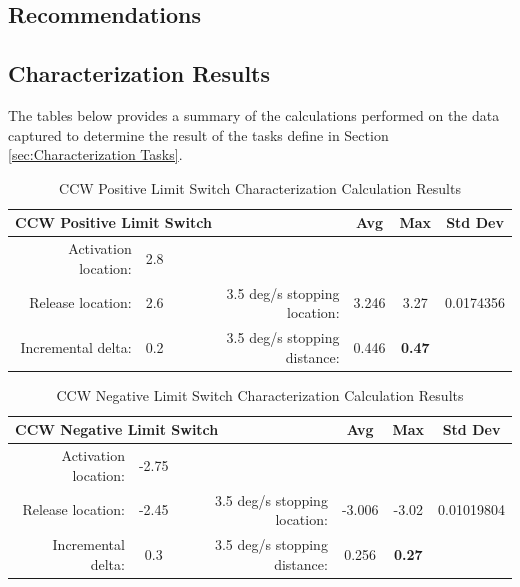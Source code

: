 \documentclass[SE,lsstdraft,authoryear,toc]{lsstdoc}
\begin{document}
\begin{landscape}
\section{Recommendations}

\subsection{Characterization Results}

The tables below provides a summary of the calculations performed on the
data captured to determine the result of the tasks define in Section \ref{sec:Characterization Tasks}.

\begin{table}[h!]
  \begin{center}
    \caption{CCW Positive Limit Switch Characterization Calculation Results}
    \label{tab:table1}
    \begin{tabular}{r|c|r|c|c|c}
    \multicolumn{3}{l|}{\textbf{CCW Positive Limit Switch}} & Avg & Max & Std Dev\\
    \midrule
    Activation location: & 2.8 & & & & \\
    Release location: & 2.6 & 3.5 deg/s stopping location: & 3.246 & 3.27 & 0.0174356 \\
    Incremental delta: & 0.2 & 3.5 deg/s stopping distance: & 0.446 & \textbf{0.47} & \\
    \end{tabular}
  \end{center}
\end{table}

\begin{table}[h!]
  \begin{center}
    \caption{CCW Negative Limit Switch Characterization Calculation Results}
    \label{tab:table2}
    \begin{tabular}{r|c|r|c|c|c}
    \multicolumn{3}{l|}{\textbf{CCW Negative Limit Switch}} & Avg & Max & Std Dev\\
    \midrule
    Activation location: & -2.75 & & & & \\
    Release location: & -2.45 & 3.5 deg/s stopping location: & -3.006 & -3.02 & 0.01019804 \\
    Incremental delta: & 0.3 & 3.5 deg/s stopping distance: & 0.256 & \textbf{0.27} & \\
    \end{tabular}
  \end{center}
\end{table}


\end{landscape}
\end{document}
